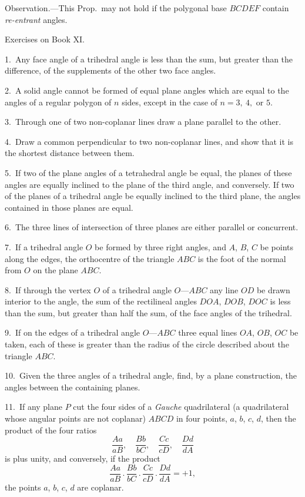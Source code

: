\documentclass[oneside]{book}
\newcommand\exhead[1]{
\Needspace*{5\baselineskip}\begin{center}
\textsf{#1}
\end{center}
}
\begin{document}
\smallskip
\begin{footnotesize}
\textsf{Observation.}---This Prop.\ may not hold if the polygonal base
$BCDEF$ contain \emph{re-entrant} angles.
\par\end{footnotesize}

\exhead{Exercises on Book XI\@.}

\begin{footnotesize}
1.~Any face angle of a trihedral angle is less than the sum, but
greater than the difference, of the supplements of the other two
face angles.

2.~A solid angle cannot be formed of equal plane angles which
are equal to the angles of a regular polygon of $n$ sides, except in
the case of $n = 3,\ 4, \text{\ or } 5$.

3.~Through one of two non-coplanar lines draw a plane parallel
to the other.

4.~Draw a common perpendicular to two non-coplanar lines,
and show that it is the shortest distance between them.

5.~If two of the plane angles of a tetrahedral angle be equal,
the planes of these angles are equally inclined to the plane of the
third angle, and conversely. If two of the planes of a trihedral
angle be equally inclined to the third plane, the angles contained
in those planes are equal.

6.~The three lines of intersection of three planes are either
parallel or concurrent.

7.~If a trihedral angle $O$ be formed by three right angles, and
$A$, $B$, $C$ be points along the edges, the orthocentre of the triangle
$ABC$ is the foot of the normal from $O$ on the plane $ABC$.

8.~If through the vertex $O$ of a trihedral angle $O$---$ABC$ any
line $OD$ be drawn interior to the angle, the sum of the rectilineal
angles $DOA$, $DOB$, $DOC$ is less than the sum, but greater than
half the sum, of the face angles of the trihedral.

9.~If on the edges of a trihedral angle $O$---$ABC$ three equal
lines $OA$, $OB$, $OC$ be taken, each of these is greater than the
radius of the circle described about the triangle $ABC$.

10.~Given the three angles of a trihedral angle, find, by a plane
construction, the angles between the containing planes.

11.~If any plane $P$ cut the four sides of a \emph{Gauche} quadrilateral
(a quadrilateral whose angular points are not coplanar) $ABCD$ in
four points, $a$, $b$, $c$, $d$, then the product of the four ratios
\[
  \frac{Aa}{aB},\quad
  \frac{Bb}{bC},\quad
  \frac{Cc}{cD},\quad
  \frac{Dd}{dA}
\]
is plus unity, and conversely, if the product
\[
  \frac{Aa}{aB} \,.\,
  \frac{Bb}{bC} \,.\,
  \frac{Cc}{cD} \,.\,
  \frac{Dd}{dA} = +1,
\]
the points $a$, $b$, $c$, $d$ are coplanar.


\end{footnotesize}
\end{document}

